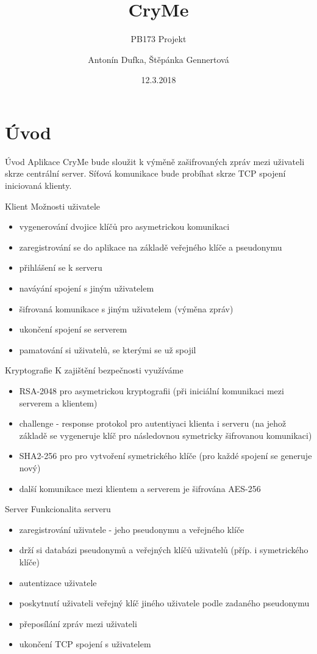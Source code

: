 \documentclass{beamer}
\title[Your Short Title]{CryMe}
\subtitle{PB173 Projekt}
\author{Antonín Dufka, Štěpánka Gennertová}
\date{12.3.2018}
\begin{document}
	
	\begin{frame}
	\titlepage
\end{frame}



\section{Úvod}
\begin{frame}{Úvod}
	Aplikace CryMe bude sloužit k výměně zašifrovaných zpráv mezi uživateli skrze centrální server. Síťová komunikace bude probíhat skrze TCP spojení iniciovaná klienty. 
\end{frame}

\begin{frame}{Klient}
Možnosti uživatele
\begin{itemize}
	\item vygenerování dvojice klíčů pro asymetrickou komunikaci
	\item zaregistrování se do aplikace na základě veřejného klíče a pseudonymu
	\item přihlášení se k serveru
	\item naváyání spojení s jiným uživatelem
	\item šifrovaná komunikace s jiným uživatelem (výměna zpráv)
	\item ukončení spojení se serverem
	\item pamatování si uživatelů, se kterými se už spojil
\end{itemize}
\end{frame}


\begin{frame}{Kryptografie}
K zajištění bezpečnosti využíváme
\begin{itemize}
	\item RSA-2048 pro asymetrickou kryptografii (při iniciální komunikaci mezi serverem a klientem)
	\item challenge - response protokol pro autentiyaci klienta i serveru (na jehož základě se vygeneruje klíč pro následovnou symetricky šifrovanou komunikaci)
	\item SHA2-256 pro pro vytvoření symetrického klíče (pro každé spojení se generuje nový)
	\item další komunikace mezi klientem a serverem je šifrována AES-256
\end{itemize}
\end{frame}


\begin{frame}{Server}
Funkcionalita serveru
\begin{itemize}
	\item zaregistrování uživatele - jeho pseudonymu a veřejného klíče
	\item drží si databázi pseudonymů a veřejných klíčů uživatelů (příp. i symetrického klíče)
	\item autentizace uživatele
	\item poskytnutí uživateli veřejný klíč jiného uživatele podle zadaného pseudonymu
	\item přeposílání zpráv mezi uživateli
	\item ukončení TCP spojení s uživatelem
\end{itemize}
\end{frame}
\end{document}
